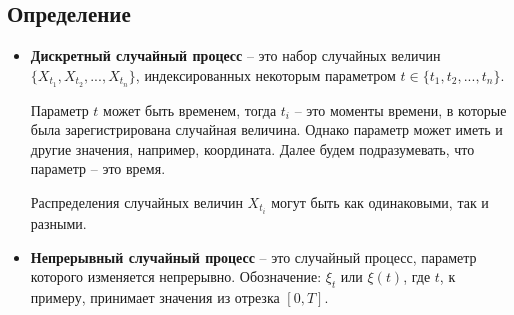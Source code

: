 \documentclass{article}
\begin{document}
\subsection{Определение}
\begin{itemize}
    \item{
        \textbf{Дискретный случайный процесс} -- это набор случайных величин $\{X_{t_1}, X_{t_2}, ..., X_{t_n}\}$, индексированных некоторым параметром $t \in \{t_1, t_2, ..., t_n\}$. 

        Параметр $t$ может быть временем, тогда $t_i$ -- это моменты времени, в которые была зарегистрирована случайная величина. Однако параметр может иметь и другие значения, например, координата. Далее будем подразумевать, что параметр -- это время.

        Распределения случайных величин $X_{t_i}$ могут быть как одинаковыми, так и разными.
    }

    \item{
        \textbf{Непрерывный случайный процесс} -- это случайный процесс, параметр которого изменяется непрерывно. Обозначение: $\xi_t$ или $\xi(t)$, где $t$, к примеру, принимает значения из отрезка $[0, T]$.
    } 
\end{itemize}
\end{document}
